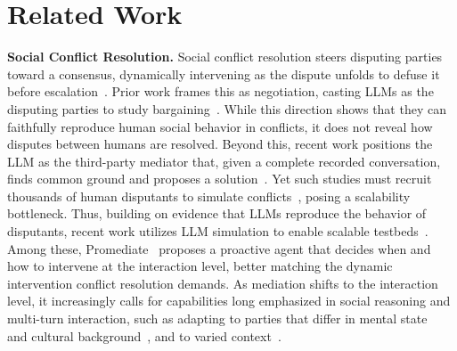 \section{Related Work}
\label{sec:relatedwork}

\noindent\textbf{{Social Conflict Resolution.}}
Social conflict resolution steers disputing parties toward a consensus, dynamically intervening as the dispute unfolds to defuse it before escalation~\citep{deutsch2011handbook}. Prior work frames this as negotiation, casting LLMs as the disputing parties to study bargaining~\citep{bianchi2024well, zhou2024sotopia, kwon2024llms}. While this direction shows that they can faithfully reproduce human social behavior in conflicts, it does not reveal how disputes between humans are resolved.
%
Beyond this, recent work positions the LLM as the third-party mediator that, given a complete recorded conversation, finds common ground and proposes a solution~\citep{tan2024robots, tessler2024habermas}. Yet such studies must recruit thousands of human disputants to simulate conflicts~\citep{chawla2021casino, hale2025kodis, tessler2024habermas}, posing a scalability bottleneck. 
%
Thus, building on evidence that LLMs reproduce the behavior of disputants, recent work utilizes LLM simulation to enable scalable testbeds~\citep{chen2026simulating}. Among these, Promediate~\citep{liu2025promediate} proposes a proactive agent that decides when and how to intervene at the interaction level, better matching the dynamic intervention conflict resolution demands. As mediation shifts to the interaction level, it increasingly calls for capabilities long emphasized in social reasoning and multi-turn interaction, such as adapting to parties that differ in mental state~\citep{xiao2025towards} and cultural background~\citep{ki2025multiple}, and to varied context~\citep{shapira2024clever}.





